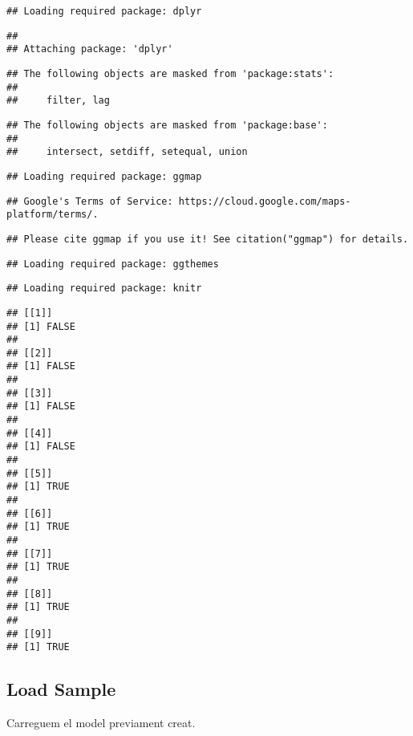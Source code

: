 \documentclass[12pt,]{article}
\begin{document}
\begin{verbatim}
## Loading required package: dplyr
\end{verbatim}

\begin{verbatim}
## 
## Attaching package: 'dplyr'
\end{verbatim}

\begin{verbatim}
## The following objects are masked from 'package:stats':
## 
##     filter, lag
\end{verbatim}

\begin{verbatim}
## The following objects are masked from 'package:base':
## 
##     intersect, setdiff, setequal, union
\end{verbatim}

\begin{verbatim}
## Loading required package: ggmap
\end{verbatim}

\begin{verbatim}
## Google's Terms of Service: https://cloud.google.com/maps-platform/terms/.
\end{verbatim}

\begin{verbatim}
## Please cite ggmap if you use it! See citation("ggmap") for details.
\end{verbatim}

\begin{verbatim}
## Loading required package: ggthemes
\end{verbatim}

\begin{verbatim}
## Loading required package: knitr
\end{verbatim}

\begin{verbatim}
## [[1]]
## [1] FALSE
## 
## [[2]]
## [1] FALSE
## 
## [[3]]
## [1] FALSE
## 
## [[4]]
## [1] FALSE
## 
## [[5]]
## [1] TRUE
## 
## [[6]]
## [1] TRUE
## 
## [[7]]
## [1] TRUE
## 
## [[8]]
## [1] TRUE
## 
## [[9]]
## [1] TRUE
\end{verbatim}

\hypertarget{load-sample}{%
\subsection{Load Sample}\label{load-sample}}

Carreguem el model previament creat.
\end{document}
